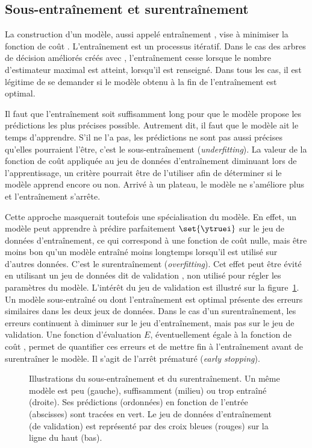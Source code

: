 \subsection{Sous-entraînement et surentraînement}
La construction d'un modèle, aussi appelé \og entraînement \fg,
vise à minimiser la fonction de coût \Loss.
L'entraînement est un processus itératif.
Dans le cas des arbres de décision améliorés créés avec \XGBOOST,
l'entraînement cesse lorsque le nombre d'estimateur maximal est atteint, lorsqu'il est renseigné.
Dans tous les cas, il est légitime de se demander si le modèle obtenu à la fin de l'entraînement est optimal.
\par
Il faut que l'entraînement soit suffisamment long pour que le modèle propose les prédictions les plus précises possible.
Autrement dit, il faut que le modèle ait le temps d'apprendre.
S'il ne l'a pas, les prédictions ne sont pas aussi précises qu'elles pourraient l'être, c'est le sous-entraînement (\emph{underfitting}).
La valeur de la fonction de coût appliquée au jeu de données d'entraînement diminuant lors de l'apprentissage,
un critère pourrait être de l'utiliser afin de déterminer si le modèle apprend encore ou non.
Arrivé à un plateau, le modèle ne s'améliore plus et l'entraînement s'arrête.
\par
Cette approche masquerait toutefois une spécialisation du modèle.
En effet, un modèle peut apprendre à prédire parfaitement $\set{\ytruei}$ sur le jeu de données d'entraînement,
ce qui correspond à une fonction de coût nulle,
mais être moins bon qu'un modèle entraîné moins longtemps lorsqu'il est utilisé sur d'autres données.
C'est le surentraînement (\emph{overfitting}).
Cet effet peut être évité en utilisant un jeu de données dit de \og validation \fg,
non utilisé pour régler les paramètres du modèle.
L'intérêt du jeu de validation est illustré sur la figure~\ref{fig-underfitting_and_overfitting}.
Un modèle sous-entraîné ou dont l'entraînement est optimal présente des erreurs similaires dans les deux jeux de données.
Dans le cas d'un surentraînement, les erreurs continuent à diminuer sur le jeu d'entraînement, mais pas sur le jeu de validation.
Une fonction d'évaluation $E$, éventuellement égale à la fonction de coût \Loss, permet de quantifier ces erreurs et de mettre fin à l'entraînement avant de surentraîner le modèle.
Il s'agit de l'arrêt prématuré (\emph{early stopping}).
\begin{figure}[h]
\centering

\caption[Illustrations du sous-entraînement et du surentraînement.]{Illustrations du sous-entraînement et du surentraînement.
Un même modèle est peu (gauche), suffisamment (milieu) ou trop entraîné (droite). Ses prédictions (ordonnées) en fonction de l'entrée (abscisses) sont tracées en vert.
Le jeu de données d'entraînement (de validation) est représenté par des croix bleues (rouges) sur la ligne du haut (bas).}
\label{fig-underfitting_and_overfitting}
\end{figure}